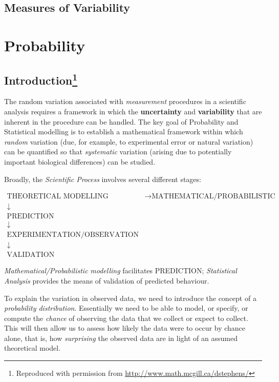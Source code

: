 \documentclass[]{book}
\let\rmarkdownfootnote\footnote%
\def\footnote{\protect\rmarkdownfootnote}
\theoremstyle{definition}
\theoremstyle{definition}
\theoremstyle{definition}
\theoremstyle{remark}
\begin{document}
\section{Measures of Variability}\label{measures-of-variability}

\hypertarget{probability}{\chapter{Probability}\label{probability}}

\section*{\texorpdfstring{Introduction\footnote{Reproduced with
  permission from \url{http://www.math.mcgill.ca/dstephens/}}}{Introduction}}\label{introduction1}

The random variation associated with \emph{measurement} procedures in a
scientific analysis requires a framework in which the
\textbf{uncertainty} and \textbf{variability} that are inherent in the
procedure can be handled. The key goal of Probability and Statistical
modelling is to establish a mathematical framework within which
\emph{random} variation (due, for example, to experimental error or
natural variation) can be quantified so that \emph{systematic} variation
(arising due to potentially important biological differences) can be
studied.

Broadly, the \textit{Scientific Process} involves several different
stages:

\begin{equation*}
\begin{array}{cl}
\text{{THEORETICAL MODELLING}} & \rightarrow \text{{MATHEMATICAL/PROBABILISTIC MODELLING}} \\
\downarrow &  \\
\text{{PREDICTION}} &  \\
\downarrow &  \\
\text{{EXPERIMENTATION/OBSERVATION}} &  \\
\downarrow &  \\
\text{{VALIDATION}} &
\end{array}
\end{equation*}

\emph{Mathematical/Probabilistic} \emph{modelling} facilitates
PREDICTION; \emph{Statistical Analysis} provides the means of validation
of predicted behaviour.

To explain the variation in observed data, we need to introduce the
concept of a \emph{probability distribution}. Essentially we need to be
able to model, or specify, or compute the \emph{chance} of observing the
data that we collect or expect to collect. This will then allow us to
assess how likely the data were to occur by chance alone, that is, how
\emph{surprising} the observed data are in light of an assumed
theoretical model.
\end{document}
